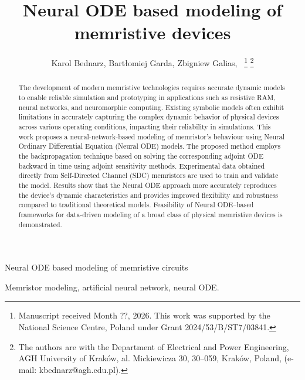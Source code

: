 \documentclass[a4,journal]{IEEEtran}
\makeatletter
\newcommand{\listoftodos}{\section*{List of TODOs}\@starttoc{tod}}
\makeatother
\begin{document}
\title{Neural ODE based modeling of memristive devices}
\author{Karol Bednarz, Bartłomiej Garda, Zbigniew Galias,~ %
  \thanks{Manuscript received Month ??, 2026. This work was supported by the National Science Centre, Poland under Grant 2024/53/B/ST7/03841.}
  \thanks{The authors are with the Department of Electrical and Power Engineering, AGH University of Krak\'ow, al. Mickiewicza 30, 30--059, Krak\'ow, Poland, (e-mail: kbednarz@agh.edu.pl).} %
}

{Neural ODE based modeling of memristive circuits} %

\maketitle

\begin{abstract}
  The development of modern memristive technologies requires accurate dynamic models to enable reliable simulation and prototyping in applications such as resistive RAM, neural networks, and neuromorphic computing. Existing symbolic models often exhibit limitations in accurately capturing the complex dynamic behavior of physical devices across various operating conditions, impacting their reliability in simulations. This work proposes a neural-network-based modeling of memristor's behaviour using Neural Ordinary Differential Equation (Neural ODE) models. The proposed method employs the backpropagation technique based on solving the corresponding adjoint ODE backward in time using adjoint sensitivity methods. Experimental data obtained directly from Self-Directed Channel (SDC) memristors are used to train and validate the model. Results show that the Neural ODE approach more accurately reproduces the device’s dynamic characteristics and provides improved flexibility and robustness compared to traditional theoretical models. Feasibility of Neural ODE–based frameworks for data-driven modeling of a broad class of physical memristive devices is demonstrated.
\end{abstract}
\begin{IEEEkeywords}
  Memristor modeling, artificial neural network, neural ODE. %
\end{IEEEkeywords} 

\end{document}
